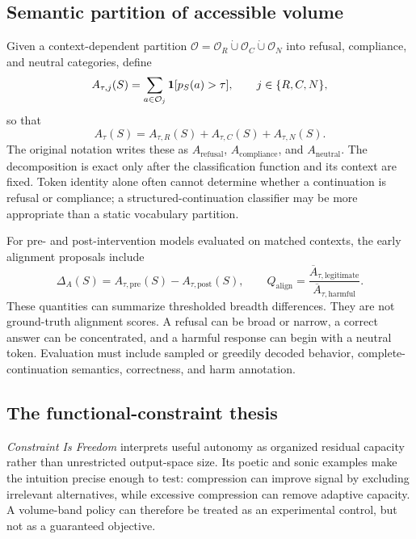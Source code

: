 \subsection{Semantic partition of accessible volume}
Given a context-dependent partition $\mathcal O=\mathcal O_R\dot\cup\mathcal O_C\dot\cup\mathcal O_N$ into refusal, compliance, and neutral categories, define
\begin{equation}
A_{\tau,j}(S)=\sum_{a\in\mathcal O_j}\mathbf 1[p_S(a)>\tau],
\qquad j\in\{R,C,N\},
\end{equation}
so that
\begin{equation}
A_\tau(S)=A_{\tau,R}(S)+A_{\tau,C}(S)+A_{\tau,N}(S).
\label{eq:semantic-decomposition}
\end{equation}
The original notation writes these as $A_{\mathrm{refusal}}$, $A_{\mathrm{compliance}}$, and $A_{\mathrm{neutral}}$. The decomposition is exact only after the classification function and its context are fixed. Token identity alone often cannot determine whether a continuation is refusal or compliance; a structured-continuation classifier may be more appropriate than a static vocabulary partition.

For pre- and post-intervention models evaluated on matched contexts, the early alignment proposals include
\begin{equation}
\Delta_A(S)=A_{\tau,\mathrm{pre}}(S)-A_{\tau,\mathrm{post}}(S),
\qquad
Q_{\mathrm{align}}=\frac{\overline A_{\tau,\mathrm{legitimate}}}
{\overline A_{\tau,\mathrm{harmful}}}.
\label{eq:alignment-proposals}
\end{equation}
These quantities can summarize thresholded breadth differences. They are not ground-truth alignment scores. A refusal can be broad or narrow, a correct answer can be concentrated, and a harmful response can begin with a neutral token. Evaluation must include sampled or greedily decoded behavior, complete-continuation semantics, correctness, and harm annotation.

\subsection{The functional-constraint thesis}
\emph{Constraint Is Freedom} interprets useful autonomy as organized residual capacity rather than unrestricted output-space size. Its poetic and sonic examples make the intuition precise enough to test: compression can improve signal by excluding irrelevant alternatives, while excessive compression can remove adaptive capacity. A volume-band policy can therefore be treated as an experimental control, but not as a guaranteed objective.

